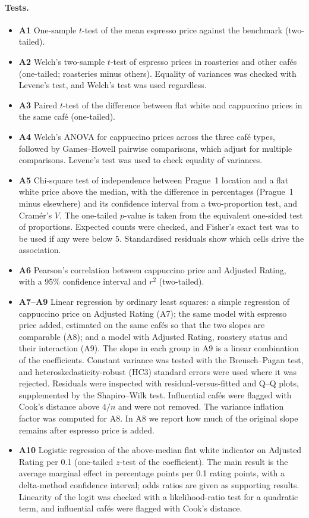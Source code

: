 \documentclass[11pt,a4paper]{article}
\begin{document}
\paragraph{Tests.}
\begin{itemize}
  \item \textbf{A1} One-sample $t$-test of the mean espresso price against the benchmark (two-tailed).
  \item \textbf{A2} Welch's two-sample $t$-test of espresso prices in roasteries and other caf\'es (one-tailed; roasteries minus others). Equality of variances was checked with Levene's test, and Welch's test was used regardless.
  \item \textbf{A3} Paired $t$-test of the difference between flat white and cappuccino prices in the same caf\'e (one-tailed).
  \item \textbf{A4} Welch's ANOVA for cappuccino prices across the three caf\'e types, followed by Games--Howell pairwise comparisons, which adjust for multiple comparisons. Levene's test was used to check equality of variances.
  \item \textbf{A5} Chi-square test of independence between Prague~1 location and a flat white price above the median, with the difference in percentages (Prague~1 minus elsewhere) and its confidence interval from a two-proportion test, and Cram\'er's $V$. The one-tailed $p$-value is taken from the equivalent one-sided test of proportions. Expected counts were checked, and Fisher's exact test was to be used if any were below 5. Standardised residuals show which cells drive the association.
  \item \textbf{A6} Pearson's correlation between cappuccino price and Adjusted Rating, with a 95\% confidence interval and $r^2$ (two-tailed).
  \item \textbf{A7--A9} Linear regression by ordinary least squares: a simple regression of cappuccino price on Adjusted Rating (A7); the same model with espresso price added, estimated on the same caf\'es so that the two slopes are comparable (A8); and a model with Adjusted Rating, roastery status and their interaction (A9). The slope in each group in A9 is a linear combination of the coefficients. Constant variance was tested with the Breusch--Pagan test, and heteroskedasticity-robust (HC3) standard errors were used where it was rejected. Residuals were inspected with residual-versus-fitted and Q--Q plots, supplemented by the Shapiro--Wilk test. Influential caf\'es were flagged with Cook's distance above $4/n$ and were not removed. The variance inflation factor was computed for A8. In A8 we report how much of the original slope remains after espresso price is added.
  \item \textbf{A10} Logistic regression of the above-median flat white indicator on Adjusted Rating per 0.1 (one-tailed $z$-test of the coefficient). The main result is the average marginal effect in percentage points per 0.1 rating points, with a delta-method confidence interval; odds ratios are given as supporting results. Linearity of the logit was checked with a likelihood-ratio test for a quadratic term, and influential caf\'es were flagged with Cook's distance.
\end{itemize}
\end{document}
